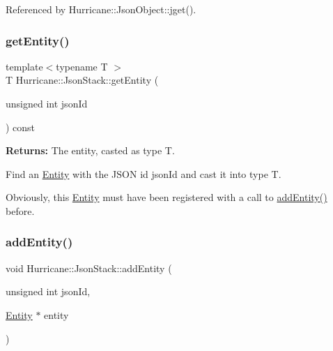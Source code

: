 Referenced by Hurricane\+::\+Json\+Object\+::jget().

\mbox{\label{classHurricane_1_1JsonStack_aadbd70d7d19d2eb0a6c9c86ca1583c76}} 
\subsubsection{\texorpdfstring{get\+Entity()}{getEntity()}}
{\footnotesize\ttfamily template$<$typename T $>$ \\
T Hurricane\+::\+Json\+Stack\+::get\+Entity (\begin{DoxyParamCaption}\item[{unsigned int}]{json\+Id }\end{DoxyParamCaption}) const\hspace{0.3cm}{\ttfamily [inline]}}

{\bfseries Returns\+:} The entity, casted as type {\ttfamily T}.

Find an \hyperlink{classHurricane_1_1Entity}{Entity} with the J\+S\+ON id {\ttfamily json\+Id} and cast it into type {\ttfamily T}.

Obviously, this \hyperlink{classHurricane_1_1Entity}{Entity} must have been registered with a call to \hyperlink{classHurricane_1_1JsonStack_a421fdf4a3bab01d75f0aab292cc574d0}{add\+Entity()} before. \mbox{\label{classHurricane_1_1JsonStack_a421fdf4a3bab01d75f0aab292cc574d0}} 
\subsubsection{\texorpdfstring{add\+Entity()}{addEntity()}}
{\footnotesize\ttfamily void Hurricane\+::\+Json\+Stack\+::add\+Entity (\begin{DoxyParamCaption}\item[{unsigned int}]{json\+Id,  }\item[{\hyperlink{classHurricane_1_1Entity}{Entity} $\ast$}]{entity }\end{DoxyParamCaption})}


